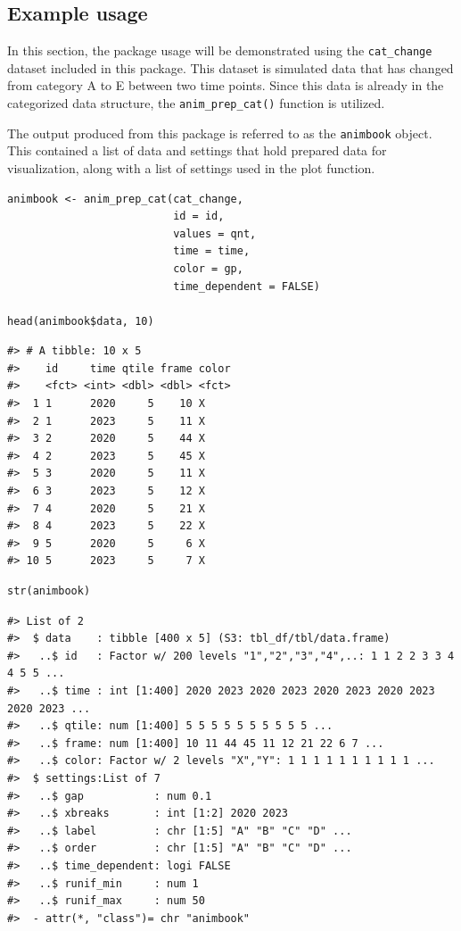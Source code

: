 \hypertarget{example-usage}{%
\subsection{Example usage}\label{example-usage}}

In this section, the package usage will be demonstrated using the \texttt{cat\_change} dataset included in this package. This dataset is simulated data that has changed from category A to E between two time points. Since this data is already in the categorized data structure, the \texttt{anim\_prep\_cat()} function is utilized.

The output produced from this package is referred to as the \texttt{animbook} object. This contained a list of data and settings that hold prepared data for visualization, along with a list of settings used in the plot function.

\begin{verbatim}
animbook <- anim_prep_cat(cat_change, 
                          id = id, 
                          values = qnt, 
                          time = time, 
                          color = gp, 
                          time_dependent = FALSE)

head(animbook$data, 10)
\end{verbatim}

\begin{verbatim}
#> # A tibble: 10 x 5
#>    id     time qtile frame color
#>    <fct> <int> <dbl> <dbl> <fct>
#>  1 1      2020     5    10 X    
#>  2 1      2023     5    11 X    
#>  3 2      2020     5    44 X    
#>  4 2      2023     5    45 X    
#>  5 3      2020     5    11 X    
#>  6 3      2023     5    12 X    
#>  7 4      2020     5    21 X    
#>  8 4      2023     5    22 X    
#>  9 5      2020     5     6 X    
#> 10 5      2023     5     7 X
\end{verbatim}

\begin{verbatim}
str(animbook)
\end{verbatim}

\begin{verbatim}
#> List of 2
#>  $ data    : tibble [400 x 5] (S3: tbl_df/tbl/data.frame)
#>   ..$ id   : Factor w/ 200 levels "1","2","3","4",..: 1 1 2 2 3 3 4 4 5 5 ...
#>   ..$ time : int [1:400] 2020 2023 2020 2023 2020 2023 2020 2023 2020 2023 ...
#>   ..$ qtile: num [1:400] 5 5 5 5 5 5 5 5 5 5 ...
#>   ..$ frame: num [1:400] 10 11 44 45 11 12 21 22 6 7 ...
#>   ..$ color: Factor w/ 2 levels "X","Y": 1 1 1 1 1 1 1 1 1 1 ...
#>  $ settings:List of 7
#>   ..$ gap           : num 0.1
#>   ..$ xbreaks       : int [1:2] 2020 2023
#>   ..$ label         : chr [1:5] "A" "B" "C" "D" ...
#>   ..$ order         : chr [1:5] "A" "B" "C" "D" ...
#>   ..$ time_dependent: logi FALSE
#>   ..$ runif_min     : num 1
#>   ..$ runif_max     : num 50
#>  - attr(*, "class")= chr "animbook"
\end{verbatim}

